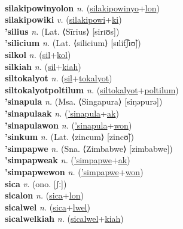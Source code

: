  \label{silakipowinyo} \\
\textbf{silakipowinyolon} \textit{n.} (\hyperref[silakipowinyo]{silakipowinyo}+\hyperref[lon]{lon})
 \label{silakipowinyolon} \\
\textbf{silakipowiki} \textit{v.} (\hyperref[silakipowi]{silakipowi}+\hyperref[ki]{ki})
 \label{silakipowiki} \\
\textbf{'silius} \textit{n.} (Lat. ⟨Sīrius⟩ [sirɪʊs])
 \label{'silius} \\
\textbf{'silicium} \textit{n.} (Lat. ⟨silicium⟩ [sɪlit͡ʃɪʊ̃])
 \label{'silicium} \\
\textbf{silkol} \textit{n.} (\hyperref[sil]{sil}+\hyperref[kol]{kol})
 \label{silkol} \\
\textbf{silkiah} \textit{n.} (\hyperref[sil]{sil}+\hyperref[kiah]{kiah})
 \label{silkiah} \\
\textbf{siltokalyot} \textit{n.} (\hyperref[sil]{sil}+\hyperref[tokalyot]{tokalyot})
 \label{siltokalyot} \\
\textbf{siltokalyotpoltilum} \textit{n.} (\hyperref[siltokalyot]{siltokalyot}+\hyperref[poltilum]{poltilum})
 \label{siltokalyotpoltilum} \\
\textbf{'sinapula} \textit{n.} (Msa. ⟨Singapura⟩ [siŋəpurə])
 \label{'sinapula} \\
\textbf{'sinapulaak} \textit{n.} (\hyperref['sinapula]{'sinapula}+\hyperref[ak]{ak})
 \label{'sinapulaak} \\
\textbf{'sinapulawon} \textit{n.} (\hyperref['sinapula]{'sinapula}+\hyperref[won]{won})
 \label{'sinapulawon} \\
\textbf{'sinkum} \textit{n.} (Lat. ⟨zincum⟩ [zincʊ̃])
 \label{'sinkum} \\
\textbf{'simpapwe} \textit{n.} (Sna. ⟨Zimbabwe⟩ [zimbabwe])
 \label{'simpapwe} \\
\textbf{'simpapweak} \textit{n.} (\hyperref['simpapwe]{'simpapwe}+\hyperref[ak]{ak})
 \label{'simpapweak} \\
\textbf{'simpapwewon} \textit{n.} (\hyperref['simpapwe]{'simpapwe}+\hyperref[won]{won})
 \label{'simpapwewon} \\
\textbf{sica} \textit{v.} (ono. [ʃː])
 \label{sica} \\
\textbf{sicalon} \textit{n.} (\hyperref[sica]{sica}+\hyperref[lon]{lon})
 \label{sicalon} \\
\textbf{sicalwel} \textit{n.} (\hyperref[sica]{sica}+\hyperref[lwel]{lwel})
 \label{sicalwel} \\
\textbf{sicalwelkiah} \textit{n.} (\hyperref[sicalwel]{sicalwel}+\hyperref[kiah]{kiah})
